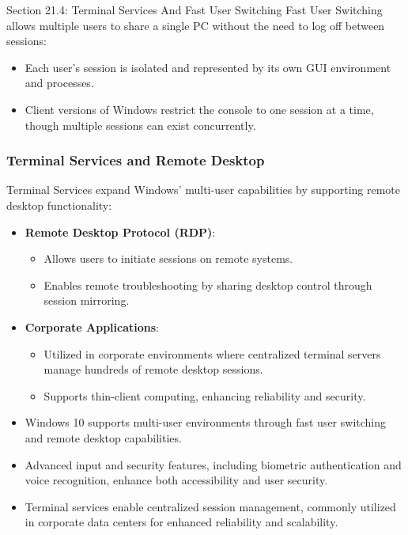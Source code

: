\begin{notes}{Section 21.4: Terminal Services And Fast User Switching}
    Fast User Switching allows multiple users to share a single PC without the need to log off between sessions:
    \begin{itemize}
        \item Each user's session is isolated and represented by its own GUI environment and processes.
        \item Client versions of Windows restrict the console to one session at a time, though multiple sessions can exist concurrently.
    \end{itemize}
    
    \subsubsection*{Terminal Services and Remote Desktop}
    
    Terminal Services expand Windows' multi-user capabilities by supporting remote desktop functionality:
    \begin{itemize}
        \item \textbf{Remote Desktop Protocol (RDP)}:
        \begin{itemize}
            \item Allows users to initiate sessions on remote systems.
            \item Enables remote troubleshooting by sharing desktop control through session mirroring.
        \end{itemize}
        \item \textbf{Corporate Applications}:
        \begin{itemize}
            \item Utilized in corporate environments where centralized terminal servers manage hundreds of remote desktop sessions.
            \item Supports thin-client computing, enhancing reliability and security.
        \end{itemize}
    \end{itemize}
    
    \begin{highlight}
        \begin{itemize}
            \item Windows 10 supports multi-user environments through fast user switching and remote desktop capabilities.
            \item Advanced input and security features, including biometric authentication and voice recognition, enhance both accessibility and user security.
            \item Terminal services enable centralized session management, commonly utilized in corporate data centers for enhanced reliability and scalability.
        \end{itemize}
    \end{highlight}
\end{notes}

